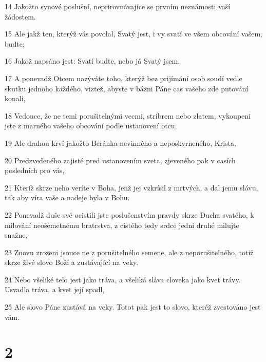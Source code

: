 \par 14 Jakožto synové poslušní, neprirovnávajíce se prvním neznámosti vaší žádostem.
\par 15 Ale jakž ten, kterýž vás povolal, Svatý jest, i vy svatí ve všem obcování vašem, budte;
\par 16 Jakož napsáno jest: Svatí budte, nebo já Svatý jsem.
\par 17 A ponevadž Otcem nazýváte toho, kterýž bez prijímání osob soudí vedle skutku jednoho každého, viztež, abyste v bázni Páne cas vašeho zde putování konali,
\par 18 Vedouce, že ne temi porušitelnými vecmi, stríbrem nebo zlatem, vykoupeni jste z marného vašeho obcování podle ustanovení otcu,
\par 19 Ale drahou krví jakožto Beránka nevinného a neposkvrneného, Krista,
\par 20 Predzvedeného zajisté pred ustanovením sveta, zjeveného pak v casích posledních pro vás,
\par 21 Kteríž skrze neho veríte v Boha, jenž jej vzkrísil z mrtvých, a dal jemu slávu, tak aby víra vaše a nadeje byla v Bohu.
\par 22 Ponevadž duše své ocistili jste poslušenstvím pravdy skrze Ducha svatého, k milování neošemetnému bratrstva, z cistého tedy srdce jedni druhé milujte snažne,
\par 23 Znovu zrozeni jsouce ne z porušitelného semene, ale z neporušitelného, totiž skrze živé slovo Boží a zustávající na veky.
\par 24 Nebo všeliké telo jest jako tráva, a všeliká sláva cloveka jako kvet trávy. Usvadla tráva, a kvet její spadl,
\par 25 Ale slovo Páne zustává na veky. Totot pak jest to slovo, kteréž zvestováno jest vám.

\chapter{2}

